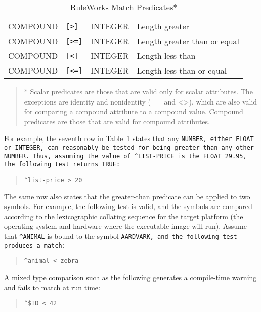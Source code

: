 \begin{table}[!h]
\begin{tabularx}{\columnwidth}{lllX}
    COMPOUND & \verb|[>]| & INTEGER & Length greater \\
    COMPOUND & \verb|[>=]| & INTEGER & Length greater than or equal \\
    COMPOUND & \verb|[<]| & INTEGER & Length less than \\
    COMPOUND & \verb|[<=]| & INTEGER & Length less than or equal \\
    \bottomrule
  \end{tabularx}
\begin{quote}
  * Scalar predicates are those that are valid only for scalar
  attributes. The exceptions are identity and nonidentity (== and <>),
  which are also valid for comparing a compound attribute to a
  compound value.  Compound predicates are those that are valid for
  compound attributes.
\end{quote}
\caption{RuleWorks Match Predicates*}
\label{t:3-2}
\end{table}


For example, the seventh row in Table~\ref{t:3-2} states that any
\tt{NUMBER}, either \tt{FLOAT} or \tt{INTEGER}, can reasonably be
tested for being greater than any other NUMBER. Thus, assuming the
value of \verb|^LIST-PRICE| is the \verb|FLOAT| 29.95, the following
test returns \verb|TRUE|:
\begin{quote}
\begin{verbatim}
^list-price > 20
\end{verbatim}
\end{quote}
The same row also states that the greater-than predicate can be
applied to two symbols. For example, the following test is valid, and
the symbols are compared according to the lexicographic collating
sequence for the target platform (the operating system and hardware
where the executable image will run). Assume that \verb|^ANIMAL| is
bound to the symbol \tt{AARDVARK}, and the following test produces a
match:
\begin{quote}
\begin{verbatim}
^animal < zebra
\end{verbatim}
\end{quote}

A mixed type comparison such as the following generates a compile-time
warning and fails to match at run time:
\begin{quote}
\begin{verbatim}
^$ID < 42
\end{verbatim}
\end{quote}

